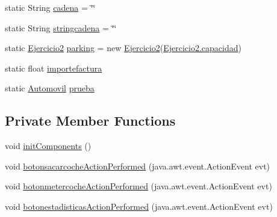 \begin{DoxyCompactItemize}
\item 
static String \mbox{\hyperlink{classejercicio2_1_1_interfaz_a4a148ec873ff4e6e92685e4cf229ee99}{cadena}} = \char`\"{}\char`\"{}
\item 
static String \mbox{\hyperlink{classejercicio2_1_1_interfaz_a5ee89e3d521857b735a19f8c74d35c75}{stringcadena}} = \char`\"{}\char`\"{}
\item 
static \mbox{\hyperlink{classejercicio2_1_1_ejercicio2}{Ejercicio2}} \mbox{\hyperlink{classejercicio2_1_1_interfaz_a842172c35a09f908f9acb6799b2e9ed9}{parking}} = new \mbox{\hyperlink{classejercicio2_1_1_ejercicio2}{Ejercicio2}}(\mbox{\hyperlink{classejercicio2_1_1_ejercicio2_a67160aed137820bd3e65ebd3a709ace7}{Ejercicio2.\+capacidad}})
\item 
static float \mbox{\hyperlink{classejercicio2_1_1_interfaz_a2b64f4f150bfb8c20d2a0a9d9ca9ba25}{importefactura}}
\item 
static \mbox{\hyperlink{classejercicio2_1_1_automovil}{Automovil}} \mbox{\hyperlink{classejercicio2_1_1_interfaz_a169b4ffdd68296971e6db4079bb6269d}{prueba}}
\end{DoxyCompactItemize}
\subsection*{Private Member Functions}
\begin{DoxyCompactItemize}
\item 
void \mbox{\hyperlink{classejercicio2_1_1_interfaz_a7be742922e57abfe6657157ca275d7fe}{init\+Components}} ()
\item 
void \mbox{\hyperlink{classejercicio2_1_1_interfaz_ade1ca9ed4198f4774821ffa554a3be9c}{botonsacarcoche\+Action\+Performed}} (java.\+awt.\+event.\+Action\+Event evt)
\item 
void \mbox{\hyperlink{classejercicio2_1_1_interfaz_aeaf9710f39bb49fe8d0a2ab0171740c4}{botonmetercoche\+Action\+Performed}} (java.\+awt.\+event.\+Action\+Event evt)
\item 
void \mbox{\hyperlink{classejercicio2_1_1_interfaz_adfb6346933f7d861f81e0f78c2c936b1}{botonestadisticas\+Action\+Performed}} (java.\+awt.\+event.\+Action\+Event evt)
\end{DoxyCompactItemize}
